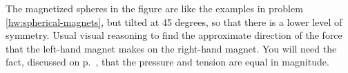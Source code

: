 The magnetized spheres in the figure are like the examples in
problem \ref{hw:spherical-magnets}, but tilted at
45 degrees, so that there is a lower level of symmetry.
Usual visual reasoning to find the approximate direction
of the force that the left-hand magnet
makes on the right-hand magnet. You will need the fact,
discussed on p.~\pageref{p-t-equal}, that the pressure
and tension are equal in magnitude.
